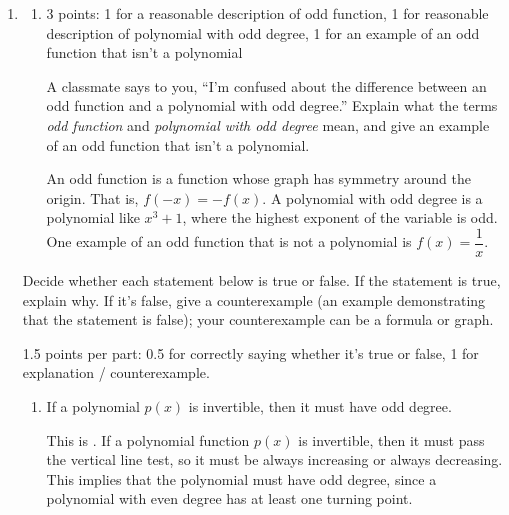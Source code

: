 \documentclass{article}
\begin{document}
\begin{enumerate}
\item  \begin{enumerate}
  \item

    \begin{grading}
      3 points: 1 for a reasonable description of odd function, 1 for reasonable description of polynomial with odd degree, 1 for an example of an odd function that isn't a polynomial
    \end{grading}

    \begin{problem}[\vfill]
      A classmate says to you, ``I'm confused about the difference between an odd function and a polynomial with odd degree.'' Explain what the terms \emph{odd function} and \emph{polynomial with odd degree} mean, and give an example of an odd function that isn't a polynomial. 
    \end{problem}

    \begin{solution}
      An odd function is a function whose graph has symmetry
      around the origin. That is, $f(-x) = -f(x)$. A polynomial with
      odd degree is a polynomial like $x^3 + 1$, where the highest
      exponent of the variable is odd. One example
      of an odd function that is not a polynomial is $f(x)=\dfrac{1}{x}$.
    \end{solution}

  \end{enumerate}

  Decide whether each statement below is true or false. If the statement is true, explain why. If it's false, give a counterexample (an example demonstrating that the statement is false); your counterexample can be a formula or graph. 

  \begin{grading}
    1.5 points per part: 0.5 for correctly saying whether it's true or false, 1 for explanation / counterexample. 
  \end{grading} 

  \begin{enumerate}[resume]

  \item
    \begin{problem}[\vfill]
      If a polynomial $p(x)$ is invertible, then it must have odd degree. 
    \end{problem}

    \begin{solution}
      This is . If a polynomial function $p(x)$ is invertible,
      then it must pass the vertical line test, so it must be always
      increasing or always decreasing. This implies that the polynomial
      must have odd degree, since a polynomial with even degree
      has at least one turning point.
    \end{solution}


\end{enumerate}
\end{enumerate}
\end{document}
